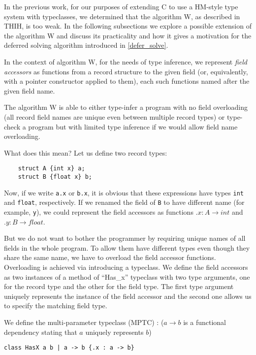 In the previous work, for our purposes of extending C to use a HM-style type system with typeclasses, we determined that the algorithm W, as described in THIH, is too weak. In the following subsections we explore a possible extension of the algorithm W and discuss its practicality and how it gives a motivation for the deferred solving algorithm introduced in \cref{defer_solve}.

In the context of algorithm W, for the needs of type inference, we represent \emph{field accessors} as functions from a record structure to the given field (or, equivalently, with a pointer constructor applied to them), each such functions named after the given field name.

The algorithm W is able to either type-infer a program with no field overloading (all record field names are unique even between multiple record types) or type-check a program but with limited type inference if we would allow field name overloading.

What does this mean? Let us define two record types:

\begin{lstlisting}
    struct A {int x} a;
    struct B {float x} b;
\end{lstlisting}

Now, if we write \lstinline{a.x} or \lstinline{b.x}, it is obvious that these expressions have types \lstinline{int} and \lstinline{float}, respectively. If we renamed the field of \lstinline{B} to have different name (for example, \lstinline{y}), we could represent the field accessors as functions $.x : A \to int$ and $.y : B \to float$.

But we do not want to bother the programmer by requiring unique names of all fields in the whole program. To allow them have different types even though they share the same name, we have to overload the field accessor functions. Overloading is achieved via introducing a typeclass. We define the field accessors as two instances of a method  of ``Has\_x'' typeclass with two type arguments, one for the record type and the other for the field type. The first type argument uniquely represents the instance of the field accessor and the second one allows us to specify the matching field type.

We define the multi-parameter typeclass (MPTC) : ($a \to b$ is a functional dependency stating that $a$ uniquely represents $b$)

\begin{center}
    \lstinline/class HasX a b | a -> b {.x : a -> b}/
\end{center}

